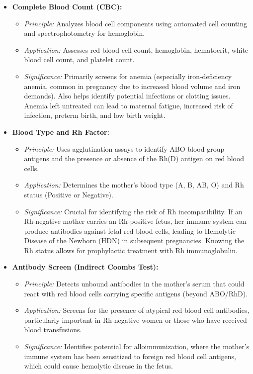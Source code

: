\documentclass{article}
\begin{document}
\begin{itemize}
    \item \textbf{Complete Blood Count (CBC):}
    \begin{itemize}
        \item \textit{Principle:} Analyzes blood cell components using automated cell counting and spectrophotometry for hemoglobin.
        \item \textit{Application:} Assesses red blood cell count, hemoglobin, hematocrit, white blood cell count, and platelet count.
        \item \textit{Significance:} Primarily screens for anemia (especially iron-deficiency anemia, common in pregnancy due to increased blood volume and iron demands). Also helps identify potential infections or clotting issues. Anemia left untreated can lead to maternal fatigue, increased risk of infection, preterm birth, and low birth weight.
    \end{itemize}
    \item \textbf{Blood Type and Rh Factor:}
    \begin{itemize}
        \item \textit{Principle:} Uses agglutination assays to identify ABO blood group antigens and the presence or absence of the Rh(D) antigen on red blood cells.
        \item \textit{Application:} Determines the mother's blood type (A, B, AB, O) and Rh status (Positive or Negative).
        \item \textit{Significance:} Crucial for identifying the risk of Rh incompatibility. If an Rh-negative mother carries an Rh-positive fetus, her immune system can produce antibodies against fetal red blood cells, leading to Hemolytic Disease of the Newborn (HDN) in subsequent pregnancies. Knowing the Rh status allows for prophylactic treatment with Rh immunoglobulin.
    \end{itemize}
    \item \textbf{Antibody Screen (Indirect Coombs Test):}
    \begin{itemize}
        \item \textit{Principle:} Detects unbound antibodies in the mother's serum that could react with red blood cells carrying specific antigens (beyond ABO/RhD).
        \item \textit{Application:} Screens for the presence of atypical red blood cell antibodies, particularly important in Rh-negative women or those who have received blood transfusions.
        \item \textit{Significance:} Identifies potential for alloimmunization, where the mother's immune system has been sensitized to foreign red blood cell antigens, which could cause hemolytic disease in the fetus.

\end{itemize}
\end{itemize}
\end{document}
